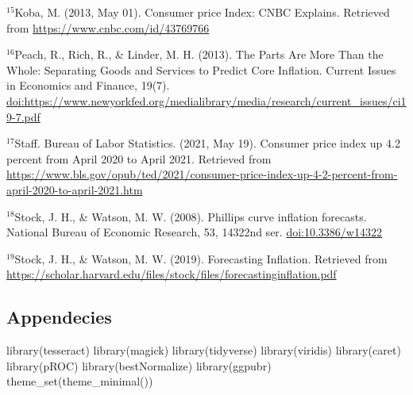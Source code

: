 \documentclass[
]{article}
\newenvironment{Shaded}{\begin{snugshade}}{\end{snugshade}}
\newcommand{\FunctionTok}[1]{\textcolor[rgb]{0.00,0.00,0.00}{#1}}
\newcommand{\NormalTok}[1]{#1}
\begin{document}
\(^{15}\)Koba, M. (2013, May 01). Consumer price Index: CNBC Explains.
Retrieved from \url{https://www.cnbc.com/id/43769766}

\(^{16}\)Peach, R., Rich, R., \& Linder, M. H. (2013). The Parts Are
More Than the Whole: Separating Goods and Services to Predict Core
Inflation. Current Issues in Economics and Finance, 19(7).
\url{doi:https://www.newyorkfed.org/medialibrary/media/research/current_issues/ci19-7.pdf}

\(^{17}\)Staff. Bureau of Labor Statistics. (2021, May 19). Consumer
price index up 4.2 percent from April 2020 to April 2021. Retrieved from
\url{https://www.bls.gov/opub/ted/2021/consumer-price-index-up-4-2-percent-from-april-2020-to-april-2021.htm}

\(^{18}\)Stock, J. H., \& Watson, M. W. (2008). Phillips curve inflation
forecasts. National Bureau of Economic Research, 53, 14322nd ser.
\url{doi:10.3386/w14322}

\(^{19}\)Stock, J. H., \& Watson, M. W. (2019). Forecasting Inflation.
Retrieved from
\url{https://scholar.harvard.edu/files/stock/files/forecastinginflation.pdf}

\hypertarget{appendecies}{%
\subsection{Appendecies}\label{appendecies}}

\begin{Shaded}
\begin{Highlighting}[]
\FunctionTok{library}\NormalTok{(tesseract)}
\FunctionTok{library}\NormalTok{(magick)}
\FunctionTok{library}\NormalTok{(tidyverse)}
\FunctionTok{library}\NormalTok{(viridis)}
\FunctionTok{library}\NormalTok{(caret)}
\FunctionTok{library}\NormalTok{(pROC)}
\FunctionTok{library}\NormalTok{(bestNormalize)}
\FunctionTok{library}\NormalTok{(ggpubr)}
\FunctionTok{theme\_set}\NormalTok{(}\FunctionTok{theme\_minimal}\NormalTok{())}
\end{Highlighting}
\end{Shaded}
\end{document}

